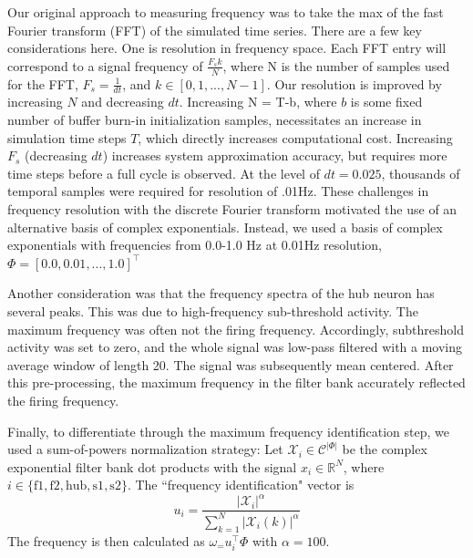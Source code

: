 \documentclass[11pt]{article}
\begin{document}
Our original approach to measuring frequency was to take the max of the fast Fourier transform (FFT) of the simulated time series.  There are a few key considerations here.  One is resolution in frequency space.  Each FFT entry will correspond to a signal frequency of $\frac{F_s k}{N}$, where N is the number of samples used for the FFT, $F_s = \frac{1}{dt}$, and $k \in \left[0, 1, ..., N-1\right]$.  Our resolution is improved by increasing $N$ and decreasing $dt$.  Increasing N = T-b, where $b$ is some fixed number of buffer burn-in initialization samples, necessitates an increase in simulation time steps $T$, which directly increases computational cost.  Increasing $F_s$ (decreasing $dt$) increases system approximation accuracy, but requires more time steps before a full cycle is observed.  At the level of $dt = 0.025$, thousands of temporal samples were required for resolution of .01Hz.  These challenges in frequency resolution with the discrete Fourier transform motivated the use of an alternative basis of complex exponentials.  Instead, we used a basis of complex exponentials with frequencies from 0.0-1.0 Hz at 0.01Hz resolution, $\Phi = \left[ 0.0, 0.01, ..., 1.0 \right]^\top$

Another consideration was that the frequency spectra of the hub neuron has several peaks.  This was due to high-frequency sub-threshold activity. The maximum frequency was often not the firing frequency.  Accordingly, subthreshold activity was set to zero, and the whole signal was low-pass filtered with a moving average window of length 20.  The signal was subsequently mean centered.  After this pre-processing, the maximum frequency in the filter bank accurately reflected the firing frequency.

Finally, to differentiate through the maximum frequency identification step, we used a sum-of-powers normalization strategy: Let $\mathcal{X}_i \in \mathcal{C}^{|\Phi|}$ be the complex exponential filter bank dot products with the signal $x_i \in \mathbb{R}^{N}$, where $i \in \{ \text{f1}, \text{f2}, \text{hub}, \text{s1}, \text{s2} \}$.  The ``frequency identification" vector is 
\begin{equation}
u_i = \frac{|\mathcal{X}_i|^\alpha}{\sum_{k=1}^N |\mathcal{X}_i(k)|^\alpha}
\end{equation}
The frequency is then calculated as $\omega_ = u_i^\top \Phi$ with $\alpha = 100$.
\end{document}

